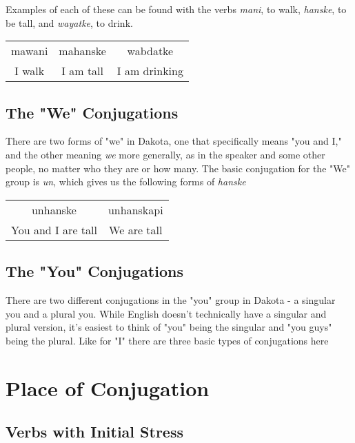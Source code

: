 \documentclass[10pt,a4paper]{article} %
\begin{document}
Examples of each of these can be found with the verbs \emph{mani}, to walk, \emph{hanske}, to be tall, and \emph{wayatke}, to drink.

\begin{center}
\begin{tabular}{c c c }
 mawani & mahanske & wabdatke \\
I walk & I am tall & I am drinking \\
\end{tabular}
\end{center}



\subsection{The "We" Conjugations}
There are two forms of "we" in Dakota, one that specifically means "you and I," and the other meaning \emph{we} more generally, as in the speaker and some other people, no matter who they are or how many.  The basic conjugation for the "We" group is \emph{un}, which gives us the following forms of \emph{hanske}

\begin{center}
\begin{tabular}{c c  }
unhanske & unhanskapi\\
You and I are tall & We are tall\\
\end{tabular}
\end{center}

\subsection{The "You" Conjugations}
There are two different conjugations in the "you" group in Dakota - a singular you and a plural you.  While English doesn't technically have a singular and plural version, it's easiest to think of "you" being the singular and "you guys" being the plural.  Like for "I" there are three basic types of conjugations here








     \section{Place of Conjugation}

\subsection{Verbs with Initial Stress}
\end{document}
